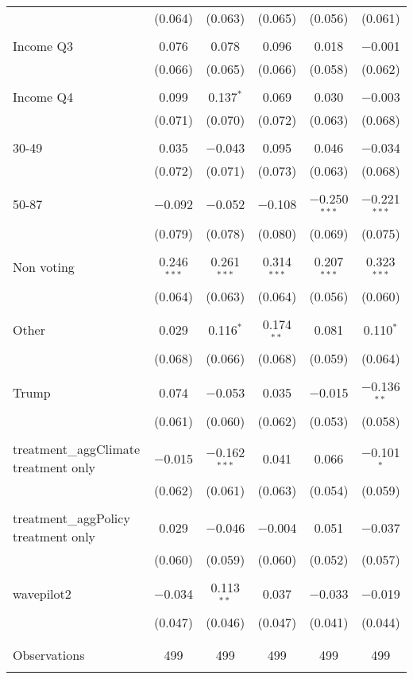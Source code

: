 \begin{tabular}{@{\extracolsep{5pt}}lccccc}
  & (0.064) & (0.063) & (0.065) & (0.056) & (0.061) \\ 
  & & & & & \\ 
 Income Q3 & 0.076 & 0.078 & 0.096 & 0.018 & $-$0.001 \\ 
  & (0.066) & (0.065) & (0.066) & (0.058) & (0.062) \\ 
  & & & & & \\ 
 Income Q4 & 0.099 & 0.137$^{*}$ & 0.069 & 0.030 & $-$0.003 \\ 
  & (0.071) & (0.070) & (0.072) & (0.063) & (0.068) \\ 
  & & & & & \\ 
 30-49 & 0.035 & $-$0.043 & 0.095 & 0.046 & $-$0.034 \\ 
  & (0.072) & (0.071) & (0.073) & (0.063) & (0.068) \\ 
  & & & & & \\ 
 50-87 & $-$0.092 & $-$0.052 & $-$0.108 & $-$0.250$^{***}$ & $-$0.221$^{***}$ \\ 
  & (0.079) & (0.078) & (0.080) & (0.069) & (0.075) \\ 
  & & & & & \\ 
 Non voting & 0.246$^{***}$ & 0.261$^{***}$ & 0.314$^{***}$ & 0.207$^{***}$ & 0.323$^{***}$ \\ 
  & (0.064) & (0.063) & (0.064) & (0.056) & (0.060) \\ 
  & & & & & \\ 
 Other & 0.029 & 0.116$^{*}$ & 0.174$^{**}$ & 0.081 & 0.110$^{*}$ \\ 
  & (0.068) & (0.066) & (0.068) & (0.059) & (0.064) \\ 
  & & & & & \\ 
 Trump & 0.074 & $-$0.053 & 0.035 & $-$0.015 & $-$0.136$^{**}$ \\ 
  & (0.061) & (0.060) & (0.062) & (0.053) & (0.058) \\ 
  & & & & & \\ 
 treatment\_aggClimate treatment only & $-$0.015 & $-$0.162$^{***}$ & 0.041 & 0.066 & $-$0.101$^{*}$ \\ 
  & (0.062) & (0.061) & (0.063) & (0.054) & (0.059) \\ 
  & & & & & \\ 
 treatment\_aggPolicy treatment only & 0.029 & $-$0.046 & $-$0.004 & 0.051 & $-$0.037 \\ 
  & (0.060) & (0.059) & (0.060) & (0.052) & (0.057) \\ 
  & & & & & \\ 
 wavepilot2 & $-$0.034 & 0.113$^{**}$ & 0.037 & $-$0.033 & $-$0.019 \\ 
  & (0.047) & (0.046) & (0.047) & (0.041) & (0.044) \\ 
  & & & & & \\ 
\hline \\[-1.8ex] 

Observations & 499 & 499 & 499 & 499 & 499 \\ 
\hline 
\hline \\[-1.8ex] 
\end{tabular} 